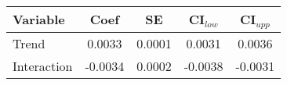 \begin{tabular}{lcccc}
\hline
Variable & Coef & SE & CI$_{low}$ & CI$_{upp}$ \\
\hline
Trend & 0.0033 & 0.0001 & 0.0031 & 0.0036 \\
Interaction & -0.0034 & 0.0002 & -0.0038 & -0.0031 \\
\hline
\end{tabular}
